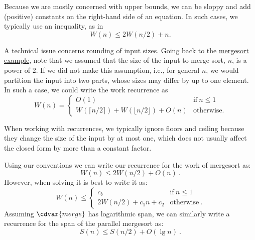\begin{cluster}
\label{grp:grm:analysis::recurrences::inequality}

\begin{gram}[Inequality]
\label{grm:analysis::recurrences::inequality}
Because we are mostly concerned with upper bounds,  we can be  sloppy and 
add (positive) constants on the right-hand side of an equation.
In such cases, we typically use an inequality, as in
\[ 
W(n) \leq 2 W(n/2) + n.
\]

\end{gram}
\end{cluster}

\begin{cluster}
\label{grp:grm:analysis::recurrences::input-size-inprecision}

\begin{gram}
\label{grm:analysis::recurrences::input-size-inprecision}
A technical issue concerns rounding of input sizes.
Going back to the \href{ex:analysis::recurrences::mergesort}{mergesort example}, note that we assumed that the size
of the input to merge sort, $n$, is a power of $2$.
If we did not make this assumption, i.e., for general $n$, 
we would partition the input into two parts, whose sizes may differ by up to one element.
In such a case, we could write the work recurrence as 
\[
W(n) = \left\{
\begin{array}{ll}
O(1) & \mbox{if} ~ n \le 1
\\
W(\lceil n/2 \rceil) + W(\lfloor n/2 \rfloor) + O(n) &  \mbox{otherwise}.
\end{array}
\right.
\]

When working with recurrences, we typically ignore floors and ceiling
because they change the size of the input by at most one, which
does not usually affect the closed form by more than a constant
factor.

\end{gram}
\end{cluster}

\begin{cluster}
\label{grp:xmpl:analysis::recurrences::mergesort-recurrence-revisited}

\begin{example}
\label{xmpl:analysis::recurrences::mergesort-recurrence-revisited}
Using our conventions we can write our recurrence for the work of
mergesort as:
\[W(n) \leq 2W(n/2) + O(n)~.\]
However, when solving it is best to write it as:
\[
W(n) \leq \left\{
\begin{array}{lll}
c_b & \mbox{if}~n \leq 1
\\
2W(n/2) + c_1 n + c_2 & \mbox{otherwise} ~.
\end{array}
\right. 
\]
Assuming $\cdvar{merge}$ has logarithmic span, we can similarly write
a recurrence for the span of the parallel mergesort as:
\[S(n) \leq S(n/2) + O(\lg n)~.\]

\end{example}
\end{cluster}


